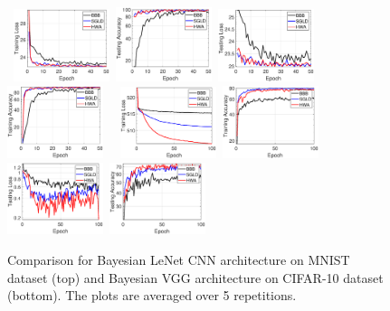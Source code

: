 \documentclass[tablecaption=bottom,wcp]{jmlr} %
\begin{document}
\begin{figure}[H]
\mbox{
\includegraphics[width=0.25\textwidth]{newfigs/trainlossmnist.eps}
\includegraphics[width=0.25\textwidth]{newfigs/trainaccmnist.eps}
\includegraphics[width=0.25\textwidth]{newfigs/testlossmnist.eps}
\includegraphics[width=0.25\textwidth]{newfigs/testaccmnist.eps}
}
\mbox{
\includegraphics[width=0.25\textwidth]{newfigs/trainlosscifar.eps}
\includegraphics[width=0.25\textwidth]{newfigs/trainacccifar.eps}
\includegraphics[width=0.25\textwidth]{newfigs/testlosscifar.eps}
\includegraphics[width=0.25\textwidth]{newfigs/testacccifar.eps}
}
 \caption{Comparison for Bayesian LeNet CNN architecture on MNIST dataset (top) and Bayesian VGG architecture on CIFAR-10 dataset (bottom). The plots are averaged over 5 repetitions.}
\label{fig:all}
\end{figure}
\end{document}
